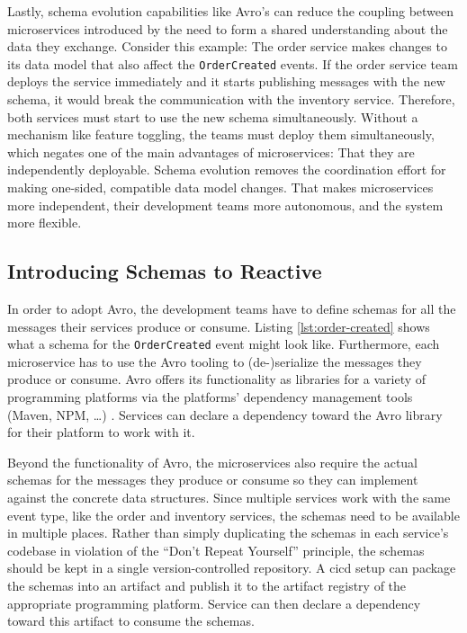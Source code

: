 Lastly, schema evolution capabilities like Avro's can reduce the coupling between microservices introduced by the need to form a shared understanding about the data they exchange.
Consider this example: The order service makes changes to its data model that also affect the \texttt{OrderCreated} events.
If the order service team deploys the service immediately and it starts publishing messages with the new schema, it would break the communication with the inventory service.
Therefore, both services must start to use the new schema simultaneously.
Without a mechanism like feature toggling, the teams must deploy them simultaneously, which negates one of the main advantages of microservices: That they are independently deployable.
Schema evolution removes the coordination effort for making one-sided, compatible data model changes.
That makes microservices more independent, their development teams more autonomous, and the system more flexible.

\subsection{Introducing Schemas to Reactive }

In order to adopt Avro, the development teams have to define schemas for all the messages their services produce or consume.
Listing \ref{lst:order-created} shows what a schema for the \texttt{OrderCreated} event might look like.
Furthermore, each microservice has to use the Avro tooling to (de-)serialize the messages they produce or consume.
Avro offers its functionality as libraries for a variety of programming platforms via the platforms' dependency management tools (Maven, NPM, \ldots) \parencite{avro}.
Services can declare a dependency toward the Avro library for their platform to work with it.

Beyond the functionality of Avro, the microservices also require the actual schemas for the messages they produce or consume so they can implement against the concrete data structures.
Since multiple services work with the same event type, like the order and inventory services, the schemas need to be available in multiple places.
Rather than simply duplicating the schemas in each service's codebase in violation of the \enquote{Don't Repeat Yourself} principle, the schemas should be kept in a single version-controlled repository.
A \gls{cicd} setup can package the schemas into an artifact and publish it to the artifact registry of the appropriate programming platform.
Service can then declare a dependency toward this artifact to consume the schemas.

